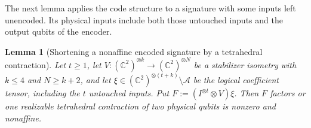 \documentclass[11pt,letterpaper,onecolumn]{article}
\theoremstyle{plain}
\newtheorem{lemma}[lemma]{Lemma}
\theoremstyle{definition}
\theoremstyle{remark}
\newcommand{\cA}{\mathscr A}
\begin{document}
The next lemma applies the code structure to a signature with some
inputs left unencoded. Its physical inputs include both those untouched
inputs and the output qubits of the encoder.

\begin{lemma}[Shortening a nonaffine encoded signature by a tetrahedral contraction]
\label{lem:a4rel-physical-code-shortening}
Let \(t\ge1\), let
\(V:(\mathbb C^2)^{\otimes k}\to(\mathbb C^2)^{\otimes N}\)
be a stabilizer isometry with \(k\le4\) and \(N\ge k+2\), and let
\(\xi\in(\mathbb C^2)^{\otimes(t+k)}\setminus\cA\) be the logical
coefficient tensor, including the \(t\) untouched inputs. Put
\(F:=(I^{\otimes t}\otimes V)\xi\).  Then \(F\) factors or one realizable
tetrahedral contraction of two physical qubits is nonzero and nonaffine.
\end{lemma}
\end{document}
